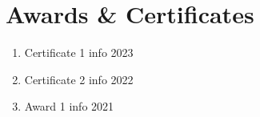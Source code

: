 \documentclass[11pt]{article}
\newcommand{\rside}[1]{
  \hfill {\normalfont\color{accent} #1}%
}
\begin{document}
\section{Awards \& Certificates}
\begin{enumerate}[label=\null, left=0pt..0pt, itemsep=0pt]
  \item Certificate 1 info \rside{2023}
  \item Certificate 2 info \rside{2022}
  \item Award 1 info \rside{2021}
\end{enumerate}

\end{document}
